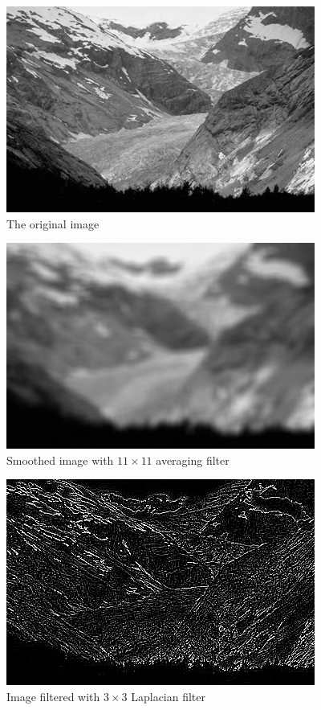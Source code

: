 \documentclass{article}
\begin{document}
\begin{figure}[]
	\centering
	\includegraphics[width=288pt]{../img/02.png}
	\caption{The original image}
\end{figure}

\begin{figure}[]
	\centering
	\includegraphics[width=288pt]{../result/average-11-11.png}
	\caption{Smoothed image with $11 \times 11$ averaging filter}
\end{figure}

\begin{figure}[]
	\centering
	\includegraphics[width=288pt]{../result/laplacian.png}
	\caption{Image filtered with $3 \times 3$ Laplacian filter}
\end{figure}
\end{document}
